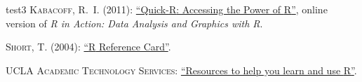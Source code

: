 \renewcommand\bibname{\normalsize{Online resources}}
\begin{thebibliography}{test3}
 \textsc{Kabacoff, R.~I.} (2011): \href{http://www.statmethods.net/index.html}{``Quick-\textsf{R}: Accessing the Power of \textsf{R}''}, online version of \emph{\textsf{R} in Action: Data Analysis and Graphics with \textsf{R}}.

 \textsc{Short, T.} (2004): \href{http://cran.r-project.org/doc/contrib/Short-refcard.pdf}{``\textsf{R} Reference Card''}.

 \textsc{UCLA Academic Technology Services}: \href{http://www.ats.ucla.edu/stat/r/}{``Resources to help you learn and use \textsf{R}''}.
\end{thebibliography}

